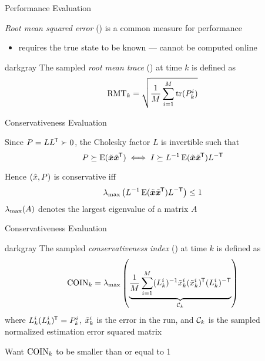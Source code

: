 \documentclass[aspectratio=1610]{beamer}
\begin{document}
\begin{frame}{Performance Evaluation}

\emph{Root mean squared error} (\abbrRMSE) is a common measure for performance
\begin{itemize}
    \item requires the true state to be known --- \alert{cannot be computed online}
\end{itemize}

\pause

\vspace{1em}

\begin{rfshadedcolorbox}[title={Root Mean Trace}]{darkgray}
    The sampled \emph{root mean trace} (\abbrRMT) at time $k$ is defined as
    \begin{equation*}
        \text{RMT}_k = \sqrt{\frac{1}{M}\sum_{i=1}^M \operatorname*{\rm tr}(P_k^i) }
    \end{equation*}
\end{rfshadedcolorbox}



\end{frame}


\begin{frame}{Conservativeness Evaluation}

Since $P=LL^{\mkern-1.5mu\mathsf{T}}\succ0$, the Cholesky factor $L$ is invertible such that
\begin{equation*}
    P \succeq \operatorname*{\rm E}(\tilde{\bm{x}}\tilde{\bm{x}}^{\mkern-1.5mu\mathsf{T}}) \iff I \succeq L^{-1} \operatorname*{\rm E}(\tilde{\bm{x}}\tilde{\bm{x}}^{\mkern-1.5mu\mathsf{T}}) L^{-\mathsf{T}}
\end{equation*}

\vspace{1em}

Hence $(\hat{x},P)$ is conservative iff
\[
    \lambda_{\max}\left(L^{-1}\operatorname*{\rm E}(\tilde{\bm{x}}\tilde{\bm{x}}^{\mkern-1.5mu\mathsf{T}}) L^{-\mathsf{T}}\right) \leq 1
\]
$\lambda_{\max}(A)$ denotes the largest eigenvalue of a matrix $A$

\end{frame}

\begin{frame}{Conservativeness Evaluation}

\begin{rfshadedcolorbox}[title={Conservativeness Index}]{darkgray}
    The sampled \emph{conservativeness index} (\abbrCOIN) at time $k$ is defined as
    \begin{equation*}
        \text{COIN}_k = \lambda_{\max}\left( \underbrace{\frac{1}{M} \sum_{i=1}^M (L_k^i)^{-1}\tilde{x}_k^i(\tilde{x}_k^i)^{\mkern-1.5mu\mathsf{T}}(L_k^i)^{-\mathsf{T}} }_{\mathcal{C}_k} \right)
    \end{equation*}
    where $L_k^i(L_k^i)^{\mkern-1.5mu\mathsf{T}}=P_k^i$, $\tilde{x}_k^i$ is the error in the \ith \abbrMC run, and $\mathcal{C}_k$ is the sampled normalized estimation error squared matrix
\end{rfshadedcolorbox}

\pause

\vspace{1em}

\alert{Want $\text{COIN}_k$ to be smaller than or equal to 1}

\end{frame}
\end{document}
